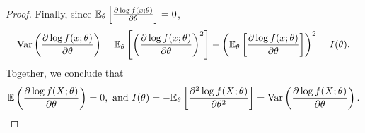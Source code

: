 \begin{proof}
Finally, since $\mathbb{E}_\theta\left[ \frac{\partial \log f(x;\theta)}{\partial\theta} \right] = 0$,
\begin{align}
\text{Var}\left( \frac{\partial \log f(x;\theta)}{\partial\theta} \right) = \mathbb{E}_\theta\left[ \left(\frac{\partial \log f(x;\theta)}{\partial\theta}\right)^2 \right] - \left( \mathbb{E}_\theta\left[ \frac{\partial \log f(x;\theta)}{\partial\theta} \right] \right)^2 = I(\theta).
\end{align}
Together, we conclude that
\begin{align}
\mathbb{E}\left( \frac{\partial\log f(X;\theta)}{\partial \theta} \right) = 0, \text{ and }
I(\theta) = -\mathbb{E}_\theta\left[ \frac{\partial^2\log f(X;\theta)}{\partial \theta^2} \right] = \text{Var}\left( \frac{\partial\log f(X;\theta)}{\partial \theta} \right).
\end{align}
\end{proof}

